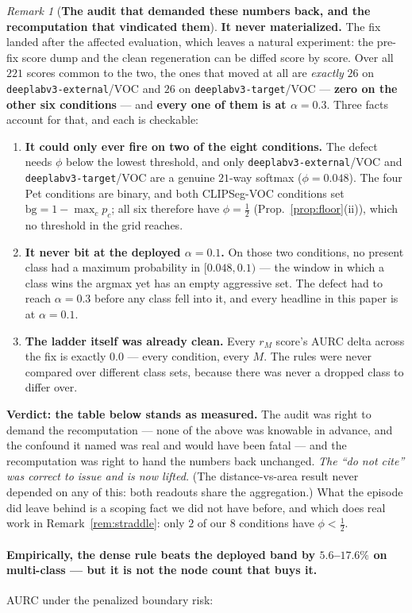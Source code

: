 \documentclass[11pt]{article}
\theoremstyle{remark}
\newtheorem{remark}{Remark}
\begin{document}
\begin{remark}[\textbf{The audit that demanded these numbers back, and the recomputation
that vindicated them}]
\textbf{It never materialized.} The fix landed after the affected evaluation, which
leaves a natural experiment: the pre-fix score dump and the clean regeneration can be
diffed score by score. Over all $221$ scores common to the two, the ones that moved at
all are \emph{exactly} $26$ on \texttt{deeplabv3-external}/VOC and $26$ on
\texttt{deeplabv3-target}/VOC --- \textbf{zero on the other six conditions} --- and
\textbf{every one of them is at $\alpha = 0.3$}. Three facts account for that, and each
is checkable:
\begin{enumerate}
\item \textbf{It could only ever fire on two of the eight conditions.} The defect needs
$\phi$ below the lowest threshold, and only \texttt{deeplabv3-external}/VOC and
\texttt{deeplabv3-target}/VOC are a genuine $21$-way softmax ($\phi = 0.048$). The four
Pet conditions are binary, and
both CLIPSeg-VOC conditions set $\mathrm{bg} = 1-\max_c p_c$; all six therefore have
$\phi = \tfrac12$ (Prop.~\ref{prop:floor}(ii)), which no threshold in the grid reaches.
\item \textbf{It never bit at the deployed $\alpha = 0.1$.} On those two conditions, no
present class had a maximum probability in $[0.048, 0.1)$ --- the window in which a class
wins the argmax yet has an empty aggressive set. The defect had to reach $\alpha = 0.3$
before any class fell into it, and every headline in this paper is at $\alpha = 0.1$.
\item \textbf{The ladder itself was already clean.} Every $r_M$ score's AURC delta across
the fix is exactly $0.0$ --- every condition, every $M$. The rules were never compared
over different class sets, because there was never a dropped class to differ over.
\end{enumerate}

\textbf{Verdict: the table below stands as measured.} The audit was right to demand the
recomputation --- none of the above was knowable in advance, and the confound it named
was real and would have been fatal --- and the recomputation was right to hand the
numbers back unchanged. \emph{The ``do not cite'' was correct to issue and is now
lifted.} (The distance-vs-area result never depended on any of this: both readouts share
the aggregation.) What the episode did leave behind is a scoping fact we did not have
before, and which does real work in Remark~\ref{rem:straddle}: only $2$ of our $8$
conditions have $\phi < \tfrac12$.
\end{remark}

\paragraph{Empirically, the dense rule beats the deployed band by $5.6$--$17.6\%$ on
multi-class --- but it is not the node count that buys it.} AURC
under the penalized boundary risk:
\end{document}
